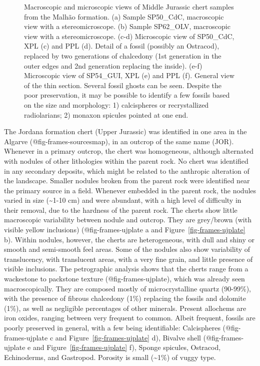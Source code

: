 \documentclass[
  a4paper,
  DIV=11,
  numbers=noendperiod]{scrreprt}
\begin{document}
\begin{figure}


\caption{\label{fig-frames-mjplate}Macroscopic and microscopic views of
Middle Jurassic chert samples from the Malhão formation. (a) Sample
SP50\_CdC, macroscopic view with a stereomicroscope. (b) Sample
SP62\_OLV, macroscopic view with a stereomicroscope. (c-d) Microscopic
view of SP50\_CdC, XPL (c) and PPL (d). Detail of a fossil (possibly an
Ostracod), replaced by two generations of chalcedony (1st generation in
the outer edges and 2nd generation replacing the inside). (e-f)
Microscopic view of SP54\_GUI, XPL (e) and PPL (f). General view of the
thin section. Several fossil ghosts can be seen. Despite the poor
preservation, it may be possible to identify a few fossils based on the
size and morphology: 1) calcispheres or recrystallized radiolarians; 2)
monaxon spicules pointed at one end.}

\end{figure}%

The Jordana formation chert (Upper Jurassic) was identified in one area
in the Algarve (@fig-frames-sourcesmap), in an outcrop of the same name
(JOR). Whenever in a primary outcrop, the chert was homogeneous,
although alternated with nodules of other lithologies within the parent
rock. No chert was identified in any secondary deposits, which might be
related to the anthropic alteration of the landscape. Smaller nodules
broken from the parent rock were identified near the primary source in a
field. Whenever embedded in the parent rock, the nodules varied in size
(\textasciitilde1-10 cm) and were abundant, with a high level of
difficulty in their removal, due to the hardness of the parent rock. The
cherts show little macroscopic variability between nodule and outcrop.
They are grey/brown (with visible yellow inclusions)
(@fig-frames-ujplate a and Figure~\ref{fig-frames-ujplate} b). Within
nodules, however, the cherts are heterogeneous, with dull and shiny or
smooth and semi-smooth feel areas. Some of the nodules also show
variability of translucency, with translucent areas, with a very fine
grain, and little presence of visible inclusions. The petrographic
analysis shows that the cherts range from a wackestone to packstone
texture (@fig-frames-ujplate), which was already seen macroscopically.
They are composed mostly of microcrystalline quartz (90-99\%), with the
presence of fibrous chalcedony (1\%) replacing the fossils and dolomite
(1\%), as well as negligible percentages of other minerals. Present
allochems are iron oxides, ranging between very frequent to common.
Albeit frequent, fossils are poorly preserved in general, with a few
being identifiable: Calcispheres (@fig-frames-ujplate c and
Figure~\ref{fig-frames-ujplate} d), Bivalve shell (@fig-frames-ujplate e
and Figure~\ref{fig-frames-ujplate} f), Sponge spicules, Ostracod,
Echinoderms, and Gastropod. Porosity is small (\textasciitilde1\%) of
vuggy type.
\end{document}
